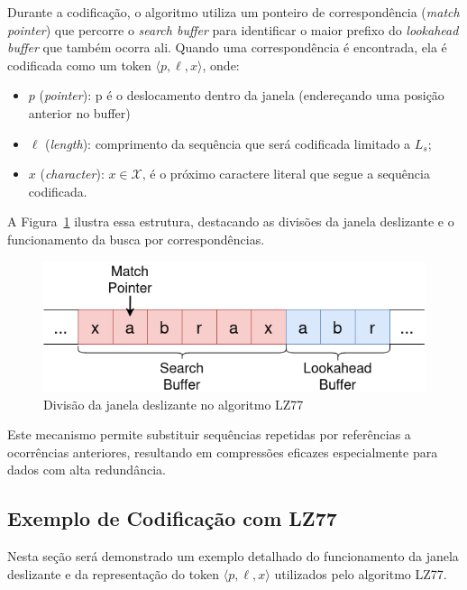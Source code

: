 Durante a codificação, o algoritmo utiliza um ponteiro de correspondência
(\textit{match pointer}) que percorre o \textit{search buffer} para identificar
o maior prefixo do \textit{lookahead buffer} que também ocorra ali. Quando uma
correspondência é encontrada, ela é codificada como um token $\langle p, \ell,
  x \rangle$, onde:
\begin{itemize}
  \item $p$ (\textit{pointer}): p é o deslocamento dentro da janela (endereçando uma posição anterior no buffer)
  \item $\ell$ (\textit{length}): comprimento da sequência que será codificada limitado a $L_{s}$;
  \item $x$ (\textit{character}): $x \in \mathcal{X}$, é o próximo caractere literal que segue a sequência codificada.
\end{itemize}

A Figura~\ref{fig:Diagrama LZ77} ilustra essa estrutura, destacando as divisões
da janela deslizante e o funcionamento da busca por correspondências.

\begin{figure}[ht]
  \centering
  \caption{Divisão da janela deslizante no algoritmo LZ77}
  \label{fig:Diagrama LZ77}
  \includegraphics[width=12cm]{figuras/DiagramasTCC-LZ77-template}
\end{figure}

Este mecanismo permite substituir sequências repetidas por referências a
ocorrências anteriores, resultando em compressões eficazes especialmente para
dados com alta redundância.

\subsection{Exemplo de Codificação com LZ77}\label{sec:LZ77_exemplo}

Nesta seção será demonstrado um exemplo detalhado do funcionamento da janela
deslizante e da representação do token $\langle p, \ell, x \rangle$ utilizados
pelo algoritmo LZ77. 

